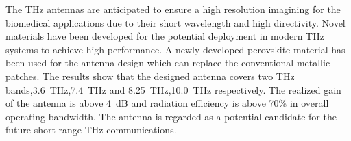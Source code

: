 \documentclass[12pt]{suhbook}
\begin{document}
The THz antennas are anticipated to ensure a high resolution imagining for the biomedical applications due to their short wavelength and high directivity. Novel materials have been developed for the potential deployment in modern THz systems to achieve high performance.  A newly developed perovskite material has been used for the antenna design which can replace the conventional metallic patches. The results show that the designed antenna covers two THz bands,\SI{3.6}{\THz},\SI{7.4}{\THz} and \SI{8.25}{\THz},\SI{10.0}{\THz} respectively. The realized gain of the antenna is above \SI{4 }{\deci\bel} and radiation efficiency is above 70\% in overall operating bandwidth. The antenna is regarded as a potential candidate for the future short-range THz communications.


\end{document}
